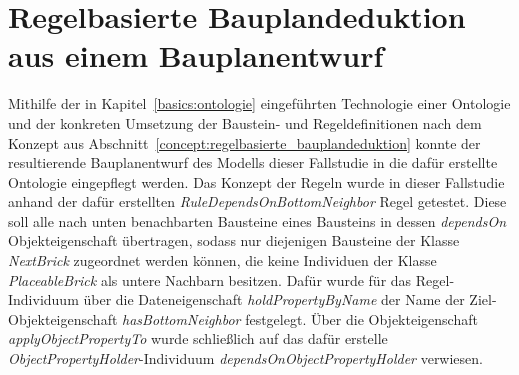 \section{Regelbasierte Bauplandeduktion aus einem Bauplanentwurf}
Mithilfe der in Kapitel~\ref{basics:ontologie} eingeführten Technologie einer Ontologie und der konkreten Umsetzung der Baustein- und Regeldefinitionen nach dem Konzept aus Abschnitt~\ref{concept:regelbasierte_bauplandeduktion} 
konnte der resultierende Bauplanentwurf des Modells dieser Fallstudie in die dafür erstellte Ontologie eingepflegt werden.
Das Konzept der Regeln wurde in dieser Fallstudie anhand der dafür erstellten \textit{RuleDependsOnBottomNeighbor} Regel getestet.
Diese soll alle nach unten benachbarten Bausteine eines Bausteins in dessen \textit{dependsOn} Objekteigenschaft übertragen, sodass nur diejenigen Bausteine der Klasse \textit{NextBrick} zugeordnet werden können, die keine Individuen der Klasse \textit{PlaceableBrick} als untere Nachbarn besitzen.
Dafür wurde für das Regel-Individuum über die Dateneigenschaft \textit{holdPropertyByName} der Name der Ziel-Objekteigenschaft \textit{hasBottomNeighbor} festgelegt.
Über die Objekteigenschaft \textit{applyObjectPropertyTo} wurde schließlich auf das dafür erstelle \textit{ObjectPropertyHolder}-Individuum \textit{dependsOnObjectPropertyHolder} verwiesen.
\newpage
